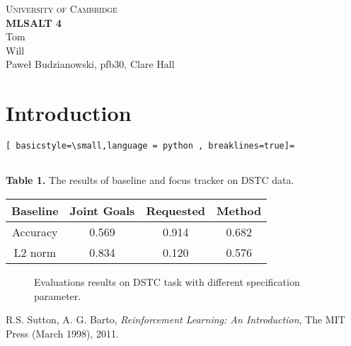 \documentclass[10pt,a4paper]{article}
\begin{document}
\begin{center}
\Large{\textsc{
University of Cambridge}}\\
\vspace{.5cm}
\large\textbf{MLSALT 4}\\
\vspace{.5cm}
\large{Tom}\\
\large{Will}\\
\large{Paweł Budzianowski, pfb30, Clare Hall}\\
\end{center} 

\section{Introduction}



\begin{lstlisting}[ basicstyle=\small,language = python , breaklines=true]=


\end{lstlisting}



 {\small \textbf{Table 1.} The results of baseline and focus tracker on DSTC data.}
\begin{center}
\begin{tabular}{c | c c c} \label{tab1}
Baseline &  Joint Goals & Requested & Method \\ \hline 
Accuracy & 0.569 & 0.914 & 0.682\\
L2 norm & 0.834  & 0.120& 0.576\\
\end{tabular} 
\end{center}

\begin{figure}[!htb]
%
\endminipage 
{}  
\endminipage\hfill
  \caption[1]{Evaluations results on DSTC task with different specification parameter.}
\end{figure}

\begin{thebibliography}{15}
 R.S. Sutton, A. G. Barto, \emph{Reinforcement Learning: An Introduction}, The MIT Press (March 1998), 2011.


\end{thebibliography}
\end{document}
